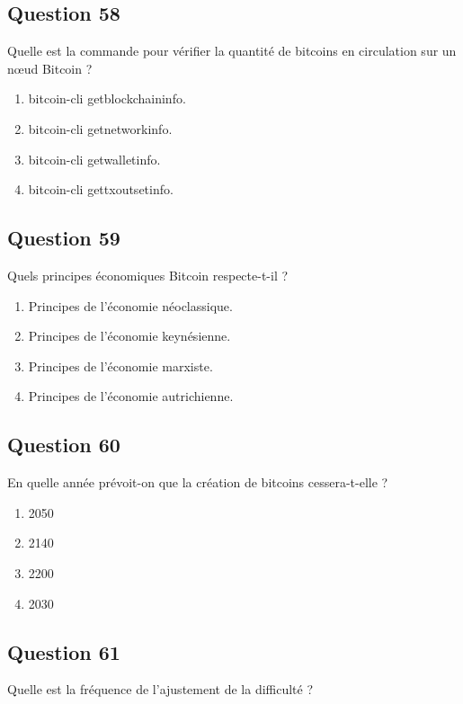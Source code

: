 \documentclass[12pt,a4paper]{article}
\begin{document}
\bigskip


\subsection*{Question 58}
Quelle est la commande pour vérifier la quantité de bitcoins en circulation sur un nœud Bitcoin ?

\begin{enumerate}[label=\Alph*., leftmargin=*]
\item bitcoin-cli getblockchaininfo.
\item bitcoin-cli getnetworkinfo.
\item bitcoin-cli getwalletinfo.
\item bitcoin-cli gettxoutsetinfo.
\end{enumerate}

\bigskip


\subsection*{Question 59}
Quels principes économiques Bitcoin respecte-t-il ?

\begin{enumerate}[label=\Alph*., leftmargin=*]
\item Principes de l'économie néoclassique.
\item Principes de l'économie keynésienne.
\item Principes de l'économie marxiste.
\item Principes de l'économie autrichienne.
\end{enumerate}

\bigskip


\subsection*{Question 60}
En quelle année prévoit-on que la création de bitcoins cessera-t-elle ?

\begin{enumerate}[label=\Alph*., leftmargin=*]
\item 2050
\item 2140
\item 2200
\item 2030
\end{enumerate}

\bigskip


\subsection*{Question 61}
Quelle est la fréquence de l'ajustement de la difficulté ?
\end{document}
